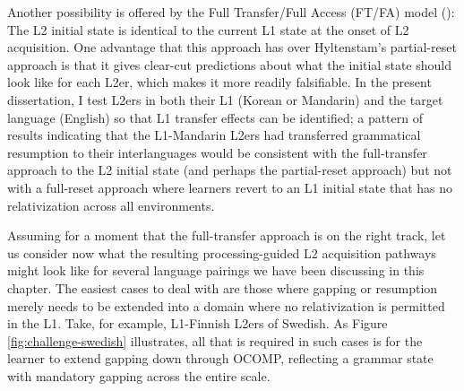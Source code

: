 Another possibility is offered by the Full Transfer/Full Access (FT/FA) model (\cite{schwartz.sprouse1994,schwartz.sprouse1996}): The L2 initial state is identical to the current L1 state at the onset of L2 acquisition. One advantage that this approach has over Hyltenstam's partial-reset approach is that it gives clear-cut predictions about what the initial state should look like for each L2er, which makes it more readily falsifiable. In the present dissertation, I test L2ers in both their L1 (Korean or Mandarin) and the target language (English) so that L1 transfer effects can be identified; a pattern of results indicating that the L1-Mandarin L2ers had transferred grammatical resumption to their interlanguages would be consistent with the full-transfer approach to the L2 initial state (and perhaps the partial-reset approach) but not with a full-reset approach where learners revert to an L1 initial state that has no relativization across all environments.

Assuming for a moment that the full-transfer approach is on the right track, let us consider now what the resulting processing-guided L2 acquisition pathways might look like for several language pairings we have been discussing in this chapter. The easiest cases to deal with are those where gapping or resumption merely needs to be extended into a domain where no relativization is permitted in the L1. Take, for example, L1-Finnish L2ers of Swedish. As Figure \ref{fig:challenge-swedish} illustrates, all that is required in such cases is for the learner to extend gapping down through OCOMP, reflecting a grammar state with mandatory gapping across the entire scale.

